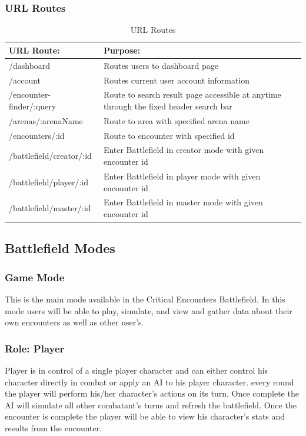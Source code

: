 \documentclass[12pt,a4paper]{report}
\begin{document}
	\subsubsection { URL Routes}
	
	\begin{table}[H]
		\begin{center}
			\begin{tabular}{ |p{5cm}|p{7cm}|| } 
				\hline
				URL Route: & Purpose: \\
				\hline
				/dashboard & Routes users to dashboard page \\
				/account & Routes current user account information\\
				/encounter-finder/:query & Route to search result page accessible at anytime through the fixed header search bar  \\
				/arenas/:arenaName & Route to area with specified arena name  \\
				/encounters/:id & Route to encounter with specified id \\
				/battlefield/creator/:id & Enter Battlefield in creator mode with given encounter id \\
				/battlefield/player/:id & Enter Battlefield in player mode with given encounter id \\
				/battlefield/master/:id & Enter Battlefield in master mode with given encounter id \\	
				\hline
			\end{tabular}
		\end{center}
		\caption{URL Routes} \label{table: URL Routes}
	\end{table}
	
	\subsection{Battlefield Modes}
	\subsubsection{Game Mode}
	This is the main mode available in the Critical Encounters Battlefield. In this mode users will be able to play, simulate, and view and gather data about their own encounters as well as other user's.
	\subsubsection{Role: Player}
	Player is in control of a single player character and can either control his character directly in combat or apply an AI to his player character. every round the player will perform his/her character's actions on its turn. Once complete the AI will simulate all other combatant's turns and refresh the battlefield. Once the encounter is complete the player will be able to view his character's stats and results from the encounter.
\end{document}
